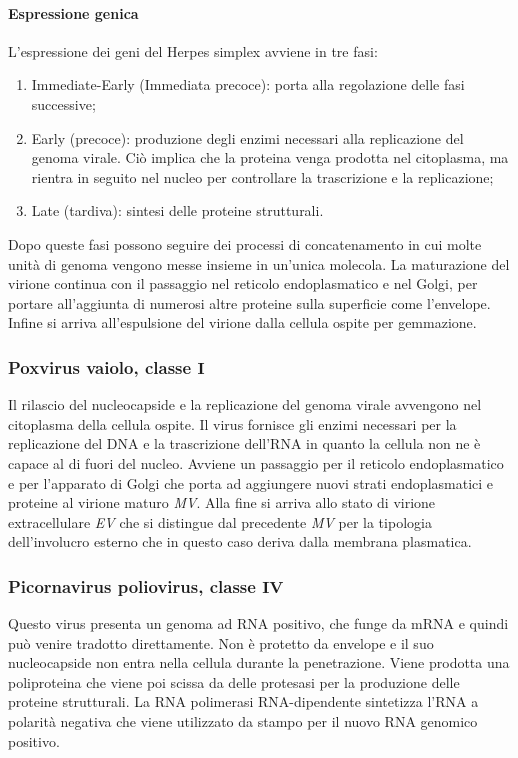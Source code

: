 			\paragraph{Espressione genica}
			L'espressione dei geni del Herpes simplex avviene in tre fasi:
			\begin{multicols}{2}
				\begin{enumerate}
    					\item Immediate-Early (Immediata precoce): porta alla regolazione delle fasi successive; 
    					\item Early (precoce): produzione degli enzimi necessari alla replicazione del genoma virale. 
						Ci\`o implica che la proteina venga prodotta nel citoplasma, ma rientra in seguito nel nucleo per controllare la trascrizione e la replicazione;
    					\item Late (tardiva): sintesi delle proteine strutturali.
				\end{enumerate}
			\end{multicols}
			Dopo queste fasi possono seguire dei processi di concatenamento in cui molte unit\`a di genoma vengono messe insieme in un'unica molecola. 
			La maturazione del virione continua con il passaggio nel reticolo endoplasmatico e nel Golgi, per portare all'aggiunta di numerosi altre proteine sulla superficie come l'envelope. 
			Infine si arriva all'espulsione del virione dalla cellula ospite per gemmazione.

		\subsubsection{Poxvirus vaiolo, classe $\mathbf{I}$}
		Il rilascio del nucleocapside e la replicazione del genoma virale avvengono nel citoplasma della cellula ospite.
		Il virus fornisce gli enzimi necessari per la replicazione del DNA e la trascrizione dell'RNA in quanto la cellula non ne \`e capace al di fuori del nucleo.
		Avviene un passaggio per il reticolo endoplasmatico e per l'apparato di Golgi che porta ad aggiungere nuovi strati endoplasmatici e proteine al virione maturo \emph{MV}. 
		Alla fine si arriva allo stato di virione extracellulare \emph{EV} che si distingue dal precedente \emph{MV} per la tipologia dell'involucro esterno che in questo caso deriva dalla membrana plasmatica.

		\subsubsection{Picornavirus poliovirus, classe $\mathbf{IV}$}
		Questo virus presenta un genoma ad RNA positivo, che funge da mRNA e quindi pu\`o venire tradotto direttamente. 
		Non \`e protetto da envelope e il suo nucleocapside non entra nella cellula durante la penetrazione.
		Viene prodotta una poliproteina che viene poi scissa da delle protesasi per la produzione delle proteine strutturali. 
		La RNA polimerasi RNA-dipendente sintetizza l'RNA a polarit\`a negativa che viene utilizzato da stampo per il nuovo RNA genomico positivo. 

